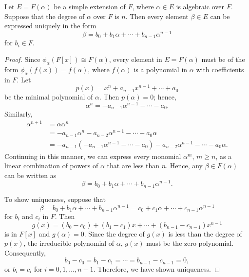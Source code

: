 \begin{theorem}\label{fields:simple_ext_theorem}
Let $E = F( \alpha )$ be a simple extension of $F$, where $\alpha \in
E$ is algebraic over $F$.  Suppose that the degree of $\alpha$ over $F$
is $n$. Then every element $\beta \in E$ can be expressed uniquely in
the form 
\[
\beta = b_0 + b_1 \alpha + \cdots + b_{n-1} \alpha^{n-1}
\]
for $b_i \in F$.
\end{theorem}
 
 
\begin{proof}  %
Since $\phi_{\alpha} ( F[x] ) \cong F( \alpha )$,  every element in $E =
F( \alpha )$ must be of the form $\phi_{\alpha} ( f(x) ) = f( \alpha
)$, where $f(\alpha)$ is a polynomial in $\alpha$ with coefficients in
$F$. Let 
\[
p(x) = x^n + a_{n-1} x^{n-1 } + \cdots + a_0
\]
be the minimal polynomial of $\alpha$. Then $p( \alpha ) = 0$; hence,
\[
{\alpha}^n = - a_{n-1} {\alpha}^{n-1} - \cdots - a_0.
\]
Similarly,
\begin{align*}
{\alpha}^{n+1} & = {\alpha} {\alpha}^n \\
& =
- a_{n-1} {\alpha}^n - a_{n-2} {\alpha}^{n-1} - \cdots - a_0
{\alpha} \\
& =
- a_{n-1}( - a_{n-1} {\alpha}^{n-1} - \cdots - a_0    ) -
a_{n-2} {\alpha}^{n-1} - \cdots - a_0 {\alpha}.
\end{align*}
Continuing in this manner, we can express every monomial ${\alpha}^m$,
$m \geq n$, as a linear combination of powers of ${\alpha}$ that are
less than $n$. Hence, any $\beta \in F( \alpha )$ can be written as 
\[
\beta = b_0 + b_1 \alpha + \cdots + b_{n-1} \alpha^{n-1}.
\]
 

To show uniqueness, suppose that
\[
\beta = 
b_0 + b_1 \alpha + \cdots + b_{n-1} \alpha^{n-1} =
c_0 + c_1 \alpha + \cdots + c_{n-1} \alpha^{n-1}
\]
for $b_i$ and $c_i$ in $F$. Then
\[
g(x) 
= 
(b_0 - c_0) + (b_1 - c_1) x + \cdots + (b_{n-1} - c_{n-1})x^{n-1}
\]
is in $F[x]$ and $g( \alpha ) = 0$. Since the degree of $g(x)$ is less
than the degree of $p( x )$, the irreducible polynomial of $\alpha$,
$g(x)$ must be the zero polynomial. Consequently, 
\[
b_0 - c_0 = b_1 - c_1 = \cdots = b_{n-1} - c_{n-1} = 0,
\]
or $b_i = c_i$ for $i = 0, 1, \ldots, n-1$.  Therefore, we have shown
uniqueness. 
\end{proof}
  

